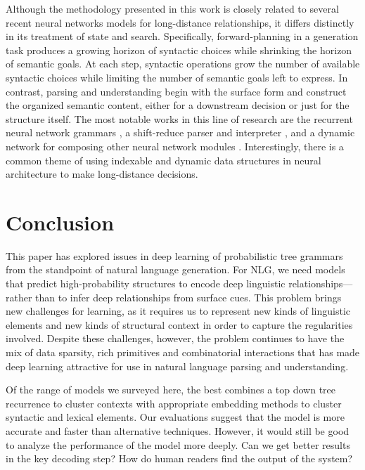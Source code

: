 \documentclass[11pt]{article}
\begin{document}
Although the methodology presented in this work is closely related to several recent neural networks models for long-distance relationships, it differs distinctly in its treatment of state and search.
%
Specifically, forward-planning in a generation task produces a growing horizon of syntactic choices while shrinking the horizon of semantic goals.
%
At each step, syntactic operations grow the number of available syntactic choices while limiting the number of semantic goals left to express. 
%
In contrast, parsing and understanding begin with the surface form and construct the organized semantic content, either for a downstream decision or just for the structure itself. 
%
The most notable works in this line of research are the recurrent neural network grammars \cite{dyer2016recurrent}, a shift-reduce parser and interpreter \cite{bowman2016fast}, and a dynamic network for composing other neural network modules \cite{Andreas2016LearningTC}. 
%
Interestingly, there is a common theme of using indexable and dynamic data structures in neural architecture to make long-distance decisions. 


\section{Conclusion}
\label{sec:conclusion}

This paper has explored issues in deep learning of probabilistic tree
grammars from the standpoint of natural language generation.  
%
For NLG, we need models that predict high-probability structures to
encode deep linguistic relationships---rather than to infer deep
relationships from surface cues.
%
This problem brings new challenges for learning, as it requires us to
represent new kinds of linguistic elements and new kinds of structural
context in order to capture the regularities involved.
%
Despite these challenges, however, the problem continues to have the
mix of data sparsity, rich primitives and combinatorial
interactions that has made deep learning attractive for use in natural
language parsing and understanding.

Of the range of models we surveyed here, the best combines a top down
tree recurrence to cluster contexts with appropriate embedding methods
to cluster syntactic and lexical elements.
%
Our evaluations suggest that the model is more accurate and faster
than alternative techniques. 
%
However, it would still be good to analyze the performance of the
model more deeply.
%
Can we get better results in the key decoding step?  How do human
readers find the output of the system?
\end{document}
